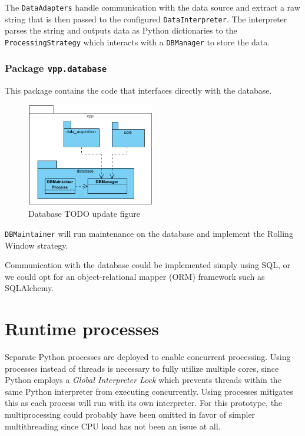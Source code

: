 The \texttt{DataAdapters} handle communication with the data source and extract a raw string that is then passed to the configured \texttt{DataInterpreter}. The interpreter parses the string and outputs data as Python dictionaries to the \texttt{ProcessingStrategy} which interacts with a \texttt{DBManager} to store the data.


\subsubsection{Package \texttt{vpp.database}}

This package contains the code that interfaces directly with the database. 

\begin{figure}[H]
	\centering
	\includegraphics[width=0.5\textwidth]{figures/class_db}
	\caption{Database TODO update figure}
	\label{}
\end{figure}

\texttt{DBMaintainer} will run maintenance on the database and implement the Rolling Window strategy.

Communication with the database could be implemented simply using SQL, or we could opt for an object-relational mapper (ORM) framework such as SQLAlchemy.


\section{Runtime processes}

Separate Python processes are deployed to enable concurrent processing. Using processes instead of threads is necessary to fully utilize multiple cores, since Python employs a \emph{Global Interpreter Lock} which prevents threads within the same Python interpreter from executing concurrently. Using processes mitigates this as each process will run with its own interpreter. For this prototype, the multiprocessing could probably have been omitted in favor of simpler multithreading since CPU load has not been an issue at all.

